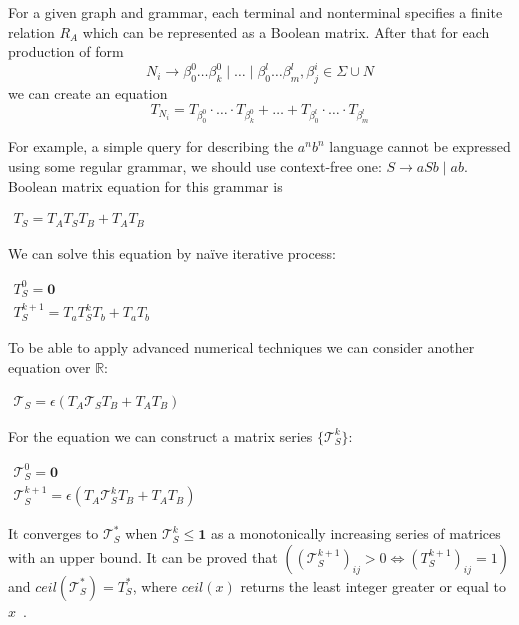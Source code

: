 \documentclass[sigconf]{acmart}
\begin{document}
For a given graph and grammar, each terminal and nonterminal specifies a finite relation $R_A$ which can be represented as a Boolean matrix.
After that for each production of form $$N_i \to \beta^0_0 \dots \beta^0_k \mid \ldots \mid \beta^l_0 \dots \beta^l_m, \beta^i_j \in \Sigma \cup N$$ we can create an equation $$T_{N_i} = T_{\beta^0_0}\cdot \ldots \cdot T_{\beta^0_k} + \ldots + T_{\beta^l_0}\cdot \ldots \cdot T_{\beta^l_m}$$

For example, a simple query for describing the $a^nb^n$ language cannot be expressed using some regular grammar, we should use context-free one: $S \rightarrow aSb \mid ab$. 
Boolean matrix equation for this grammar is
\begin{center}
\(
\left.
\begin{array}{l}
T_S = T_AT_ST_B + T_AT_B
\end{array}
\right.
\)
\end{center}

We can solve this equation by na\"ive iterative process:
\begin{center}
\(
\left.
\begin{array}{c}
T_S^0 = \mathbf{0} \\
T_S^{k+1} = T_a T_S^k T_b + T_a T_b
\end{array}
\right.
\)
\end{center}

To be able to apply advanced numerical techniques we can consider another equation over $\mathbb{R}$:

\begin{center}
\(
\left.
\begin{array}{l}
\mathcal{T}_S = \epsilon(T_A \mathcal{T}_S T_B + T_A T_B)
\end{array}
\right.
\)
\end{center}

For the equation we can construct a matrix series $\{ \mathcal{T}_S^{k}\}$:

\begin{center}
\(
\left.
\begin{array}{c}
\mathcal{T}_S^0 = \mathbf{0} \\
\mathcal{T}_S^{k+1} = \epsilon(T_A \mathcal{T}_S^k T_B + T_A T_B)
\end{array}
\right.
\)
\end{center}

It converges to $\mathcal{T}_S^*$ when $\mathcal{T}_S^{k} \leq \textbf{1}$ as a monotonically increasing series of matrices with an upper bound.
It can be proved that $((\mathcal{T}_S^{k+1})_{ij} > 0 \iff (T_S^{k+1})_{ij} = 1)$ and $ceil(\mathcal{T}_S^*) = T_S^*$, where $ceil(x)$ returns the least integer greater or equal to $x$~\cite{sato2017linear}.
\end{document}

